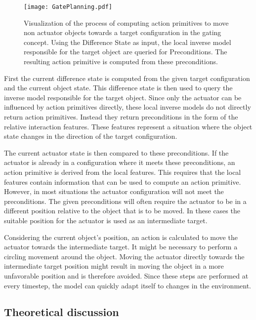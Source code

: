 \begin{figure}
	\centering
	\texttt{[image: GatePlanning.pdf]}
	\caption{Visualization of the process of computing action primitives to move non actuator objects towards a target configuration in the gating concept. Using the Difference State as input, the local inverse model responsible for the target object are queried for Preconditions. The resulting action primitive is computed from these preconditions.}
	\label{fig:GatePlanning}
\end{figure}
	
First the current difference state is computed from the given target configuration and the current object state. This difference state is then used to query the inverse model responsible for the target object. Since only the actuator can be influenced by action primitives directly, these local inverse models do not directly return action primitives. Instead they return preconditions in the form of the relative interaction features. These features represent a situation where the object state changes in the direction of the target configuration. 
	
The current actuator state is then compared to these preconditions. If the actuator is already in a configuration where it meets these preconditions, an action primitive is derived from the local features. This requires that the local features contain information that can be used to compute an action primitive.
However, in most situations the actuator configuration will not meet the preconditions. The given preconditions will often require the actuator to be in a different position relative to the object that is to be moved. In these cases the suitable position for the actuator is used as an intermediate target. 

Considering the current object's position, an action is calculated to move the actuator towards the intermediate target. It might be necessary to perform a circling movement around the object. Moving the actuator directly towards the intermediate target position might result in moving the object in a more unfavorable position and is therefore avoided. Since these steps are performed at every timestep, the model can quickly adapt itself to changes in the environment.
	
\subsection{Theoretical discussion \label{sec:gateTheoDisc}}

